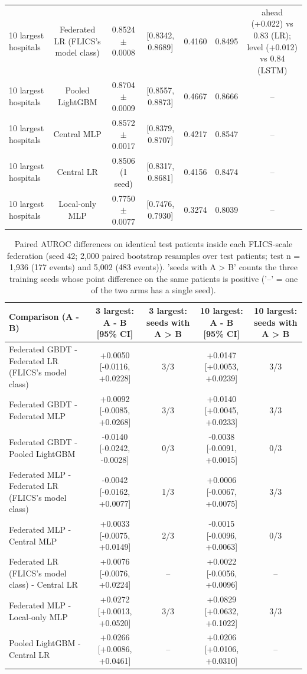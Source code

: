 \begin{table}[t]
\begin{tabular}{lcccccc}
10 largest hospitals & Federated LR (FLICS's model class) & 0.8524 $\pm$ 0.0008 & [0.8342, 0.8689] & 0.4160 & 0.8495 & ahead (+0.022) vs 0.83 (LR); level (+0.012) vs 0.84 (LSTM) \\
10 largest hospitals & Pooled LightGBM & 0.8704 $\pm$ 0.0009 & [0.8557, 0.8873] & 0.4667 & 0.8666 & – \\
10 largest hospitals & Central MLP & 0.8572 $\pm$ 0.0017 & [0.8379, 0.8707] & 0.4217 & 0.8547 & – \\
10 largest hospitals & Central LR & 0.8506 (1 seed) & [0.8317, 0.8681] & 0.4156 & 0.8474 & – \\
10 largest hospitals & Local-only MLP & 0.7750 $\pm$ 0.0077 & [0.7476, 0.7930] & 0.3274 & 0.8039 & – \\
\bottomrule
\end{tabular}
\end{table}

\begin{table}[t]
\centering\small
\caption{Paired AUROC differences on identical test patients inside each FLICS-scale federation (seed 42; 2,000 paired bootstrap resamples over test patients; test n = 1,936 (177 events) and 5,002 (483 events)). 'seeds with A > B' counts the three training seeds whose point difference on the same patients is positive ('–' = one of the two arms has a single seed).}\label{tab:flicsscale_paired}
\begin{tabular}{lcccc}
\toprule
Comparison (A - B) & 3 largest: A - B [95\% CI] & 3 largest: seeds with A > B & 10 largest: A - B [95\% CI] & 10 largest: seeds with A > B \\
\midrule
Federated GBDT - Federated LR (FLICS's model class) & +0.0050 [-0.0116, +0.0228] & 3/3 & +0.0147 [+0.0053, +0.0239] & 3/3 \\
Federated GBDT - Federated MLP & +0.0092 [-0.0085, +0.0268] & 3/3 & +0.0140 [+0.0045, +0.0233] & 3/3 \\
Federated GBDT - Pooled LightGBM & -0.0140 [-0.0242, -0.0028] & 0/3 & -0.0038 [-0.0091, +0.0015] & 0/3 \\
Federated MLP - Federated LR (FLICS's model class) & -0.0042 [-0.0162, +0.0077] & 1/3 & +0.0006 [-0.0067, +0.0075] & 3/3 \\
Federated MLP - Central MLP & +0.0033 [-0.0075, +0.0149] & 2/3 & -0.0015 [-0.0096, +0.0063] & 0/3 \\
Federated LR (FLICS's model class) - Central LR & +0.0076 [-0.0076, +0.0224] & – & +0.0022 [-0.0056, +0.0096] & – \\
Federated MLP - Local-only MLP & +0.0272 [+0.0013, +0.0520] & 3/3 & +0.0829 [+0.0632, +0.1022] & 3/3 \\
Pooled LightGBM - Central LR & +0.0266 [+0.0086, +0.0461] & – & +0.0206 [+0.0106, +0.0310] & – \\
\bottomrule
\end{tabular}
\end{table}

